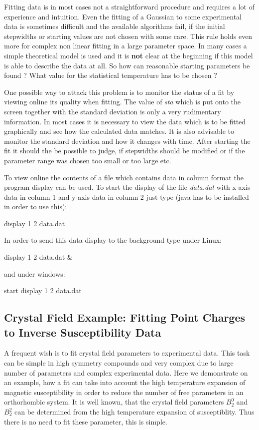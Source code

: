 Fitting data is in most cases not a straightforward procedure and requires
a lot of experience and intuition. Even the fitting of a Gaussian to some
experimental data is sometimes difficult and the available algorithms fail,
 if the initial
stepwidths or starting values are not chosen with some care.
This rule holds even more for complex non linear fitting in a large
parameter space. In many cases a simple theoretical model is used
and it is {\bf not} clear at the beginning if this model is able
to describe the data at all. 
So how can reasonable starting parameters be found ? What value
for the statistical temperature has to be chosen ?

One possible way to attack this problem is to monitor the status of a fit
by viewing online its quality when fitting. The value of {\em sta} which is put onto
the screen together with the standard deviation is only a very rudimentary information.
In most cases it is necessary to view the data which is to be fitted graphically and
see how the calculated data matches. It is also advisable to monitor the
standard deviation and how it changes with time. After starting the
fit it should the be possible to judge, if stepwidths should be modified or if
the parameter range was chosen too small or too large etc.

To view online the contents of a file which contains data in column format
the program {\prg display} can be used. To start the display of
the file {\em data.dat} with x-axis data in column 1 and y-axis data
in column 2 just type (java has to be installed in order to use this):

display 1 2 data.dat

In order to send this data display to the background type under Linux:

display 1 2 data.dat \&

and under windows:

start display 1 2 data.dat

\subsection{Crystal Field  Example: Fitting Point Charges to Inverse Susceptibility Data}

A frequent wish is to fit crystal field parameters to experimental data. This task can
be simple in high symmetry compounds and  very complex due to large number of parameters
and complex experimental data. Here we demonstrate on an example, how a fit can take into account
the high temperature expansion of magnetic susceptibility in order to reduce the
number of free parameters in an orthorhombic system. It is well known, that the 
crystal field parameters $B_2^0$ and $B_2^2$ can be determined from the high
 temperature expansion of susceptiblity. Thus there is no need to fit these parameter, this
is simple. 

